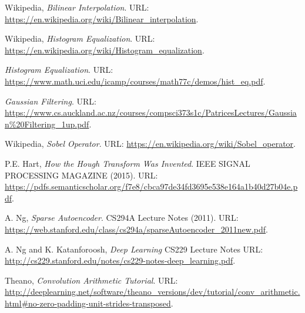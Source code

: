 \begin{thebibliography}{3}
Wikipedia,
\emph{Bilinear Interpolation}.
URL: \url{https://en.wikipedia.org/wiki/Bilinear_interpolation}.

Wikipedia,
\emph{Histogram Equalization}.
URL: \url{https://en.wikipedia.org/wiki/Histogram_equalization}.


\emph{Histogram Equalization}.
URL: \url{https://www.math.uci.edu/icamp/courses/math77c/demos/hist_eq.pdf}.


\emph{Gaussian Filtering}.
URL: \url{https://www.cs.auckland.ac.nz/courses/compsci373s1c/PatricesLectures/Gaussian%20Filtering_1up.pdf}.


Wikipedia,
\emph{Sobel Operator}.
URL: \url{https://en.wikipedia.org/wiki/Sobel_operator}.


P.E. Hart,
\emph{How the Hough Transform Was Invented}.
IEEE SIGNAL PROCESSING MAGAZINE
(2015).
URL: \url{https://pdfs.semanticscholar.org/f7e8/cbca97de34fd3695e538e164a1b40d27b04e.pdf}.




A. Ng,
\emph{Sparse Autoencoder}.
CS294A Lecture Notes
(2011).
URL: \url{https://web.stanford.edu/class/cs294a/sparseAutoencoder_2011new.pdf}.

A. Ng and K. Katanforoosh,
\emph{Deep Learning}
CS229 Lecture Notes
URL: \url{http://cs229.stanford.edu/notes/cs229-notes-deep_learning.pdf}.


Theano,
\emph{Convolution Arithmetic Tutorial}.
URL: \url{http://deeplearning.net/software/theano_versions/dev/tutorial/conv_arithmetic.html#no-zero-padding-unit-strides-transposed}.



\end{thebibliography}
